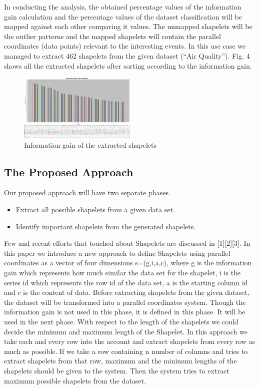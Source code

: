 \documentclass[letterpaper, 10 pt, conference]{IEEEtran}  %
\begin{document}
In conducting the analysis, the obtained percentage values of the information gain calculation and the percentage values of the dataset classification will be mapped against each other comparing it values. The unmapped shapelets will be the outlier patterns and the mapped shapelets will contain the parallel coordinates (data points) relevant to the interesting events. In this use case we managed to extract 462 shapelets from the given dataset (“Air Quality”).  Fig. 4 shows all the extracted shapelets after sorting according to the information gain.
\begin{figure}[h!]
\includegraphics[width=0.5\textwidth]{shapeletGraph.png}
\caption{Information gain of the extracted shapelets}
\end{figure}


\subsection{The Proposed Approach}
Our proposed approach will have two separate phases.

\begin{itemize}
\item Extract all possible shapelets from a given data set.
\item Identify important shapelets from the generated shapelets.
\end{itemize}

Few and recent efforts that touched about Shapelets are discussed in [1][2][3]. In this paper we introduce a new approach to define Shapelets using parallel coordinates as a vector of four dimensions s=(g,i,a,c), where g is the information gain which represents how much similar the data set for the shapelet, i is the series id which represents the row id of the data set, a is the starting column id and c is the content of data. Before extracting shapelets from the given dataset, the dataset will be transformed into a parallel coordinates system. Though the information gain is not used in this phase, it is defined in this phase. It will be used in the next phase. With respect to the length of the shapelets we could decide the minimum and maximum length of the Shapelet.  In this approach we take each and every row into the account and extract shapelets from every row as much as possible. If we take a row containing n number of columns and tries to extract shapelets from that row, maximum and the minimum lengths of the shapelets should be given to the system. Then the system tries to extract maximum possible shapelets from the dataset.
\end{document}
